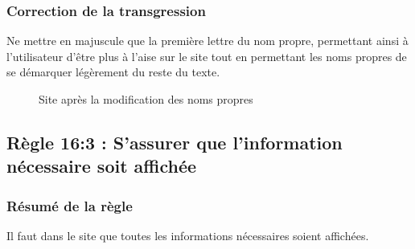 \documentclass{article}[12pt]
\begin{document}
    \subsubsection*{Correction de la transgression}
    Ne mettre en majuscule que la première lettre du nom propre, permettant ainsi à l'utilisateur d'être plus à l'aise sur le site tout en permettant les noms propres de se démarquer légèrement du reste du texte.
    \begin{figure}[H]
    	\centering  {}
    	\caption{Site après la modification des noms propres}
    \end{figure}
    \subsection{Règle 16:3 : S'assurer que l'information nécessaire soit affichée }
     \subsubsection*{Résumé de la règle}
  Il faut dans le site que toutes les informations nécessaires soient affichées.
     
\end{document}
